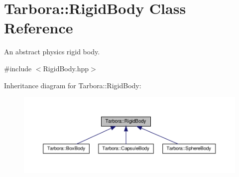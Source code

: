 \hypertarget{classTarbora_1_1RigidBody}{}\section{Tarbora\+:\+:Rigid\+Body Class Reference}
\label{classTarbora_1_1RigidBody}


An abstract physics rigid body.  




{\ttfamily \#include $<$Rigid\+Body.\+hpp$>$}



Inheritance diagram for Tarbora\+:\+:Rigid\+Body\+:
\nopagebreak
\begin{figure}[H]
\begin{center}
\leavevmode
\includegraphics[width=350pt]{classTarbora_1_1RigidBody__inherit__graph}
\end{center}
\end{figure}
